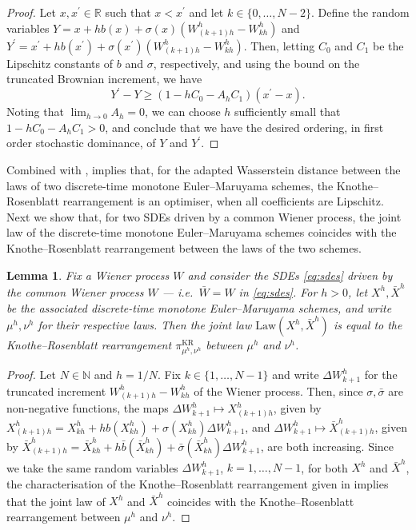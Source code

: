 \documentclass[oneside]{amsart}
\newtheorem{lemma}[theorem]{Lemma}
\theoremstyle{definition}
\newcommand{\Law}{\mathrm{Law}}
\newcommand{\N}{\mathbb N}
\newcommand{\R}{\mathbb R}
\newcommand{\kr}{\mathrm{KR}}
\def\R{{\mathbb R}}
\numberwithin{equation}{section}
\begin{document}
\begin{proof} 
	Let $x, x^\prime \in \R$ such that $x < x^\prime$ and let $k\in\{0,\dots,N-2\}$. Define the random variables $Y = x + h b(x) + \sigma(x)(W^h_{(k + 1)h} -W^h_{kh})$ and $Y^\prime = x^\prime + h b(x^\prime) + \sigma(x^\prime)(W^h_{(k+1)h} - W^h_{kh})$. Then, letting $C_0$ and $C_1$ be the Lipschitz constants of $b$ and $\sigma$, respectively, and using the bound on the truncated Brownian increment, we have
	\begin{equation}
		Y^\prime - Y \geq (1 - h C_0 - A_h C_1)(x^\prime - x).
	\end{equation}
	Noting that $\lim_{h \to 0} A_h = 0$, we can choose $h$ sufficiently small that $1 - h C_0 - A_h C_1 > 0$, and conclude that we have the desired ordering, in first order stochastic dominance, of $Y$ and $Y^\prime$.
\end{proof}

Combined with ,  implies that, for the adapted Wasserstein distance between the laws of two discrete-time monotone Euler--Maruyama schemes, the Knothe--Rosenblatt rearrangement is an optimiser, when all coefficients are Lipschitz.
Next we show that, for two SDEs driven by a common Wiener process, the joint law of the discrete-time monotone Euler--Maruyama schemes coincides with the Knothe--Rosenblatt rearrangement between the laws of the two schemes.
	
	\begin{lemma}\label{lem:kr-joint-law}
		Fix a Wiener process $W$ and consider the SDEs \eqref{eq:sdes} driven by the common Wiener process $W$ --- i.e.\ $\bar{W} = W$ in \eqref{eq:sdes}. 
		For $h > 0$, let $X^h, \bar{X}^h$ be the associated discrete-time monotone Euler--Maruyama schemes, and write $\mu^h, \nu^h$ for their respective laws. Then the joint law $\Law(X^h, \bar{X}^h)$ is equal to the Knothe--Rosenblatt rearrangement $\pi^\kr_{\mu^h, \nu^h}$ between $\mu^h$ and $\nu^h$.
	\end{lemma}
	
	\begin{proof}
		Let $N \in \N$ and $h = 1/N$. Fix $k \in \{1, \dotsc, N - 1\}$ and write $\Delta W^h_{k+1}$ for the truncated increment $W^h_{(k + 1)h} - W^h_{kh}$ of the Wiener process. Then, since $\sigma, \bar{\sigma}$ are non-negative functions, the maps $\Delta W^h_{k+1} \mapsto X^h_{(k + 1)h}$, given by $X^h_{(k+1)h} = X^h_{kh} + h b(X^h_{kh}) + \sigma(X^h_{kh}) \Delta W^h_{k+1}$, and $\Delta W^h_{k+1} \mapsto \bar{X}^h_{(k+1)h}$, given by $\bar X^h_{(k+1)h} = \bar X^h_{kh} + h\bar b(\bar X^h_{kh}) + \bar \sigma(\bar X^h_{kh}) \Delta W^h_{k+1}$, are both increasing. Since we take the same random variables $\Delta W^h_{k+1}$, $k = 1, \dotsc, N-1$, for both $X^h$ and $\bar{X}^h$, the characterisation of the Knothe--Rosenblatt rearrangement given in  implies that the joint law of $X^h$ and $\bar{X}^h$ coincides with the Knothe--Rosenblatt rearrangement between $\mu^h$ and $\nu^h$.
	\end{proof}
\end{document}
